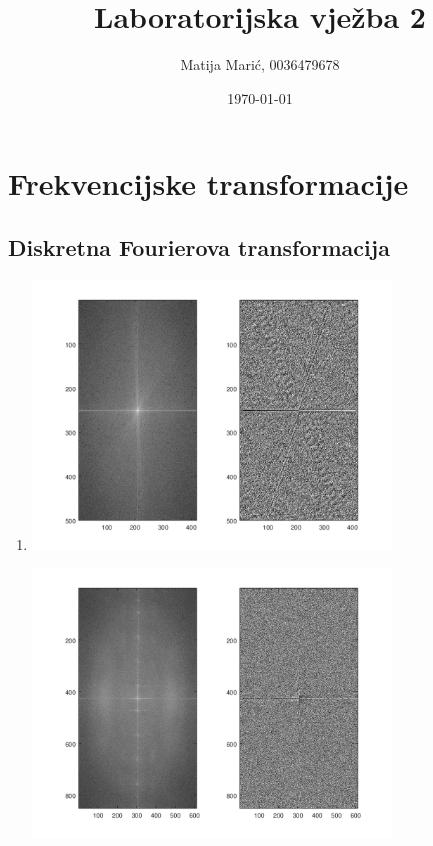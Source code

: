 \documentclass[12pt, a4]{report}
\title{Laboratorijska vježba 2}
\author{Matija Marić, 0036479678}
\date{\today}
\begin{document}
        \begin{titlepage}
            \maketitle
        \end{titlepage}

        \tableofcontents{}

        \chapter{Frekvencijske transformacije}
        \section{Diskretna Fourierova transformacija}
            \begin{enumerate}
                \item
                    \begin{minipage}{\linewidth}
                        \centering
                        \includegraphics[width=0.75\textwidth]{fft1}
                    \end{minipage}
                    \begin{minipage}{\linewidth}
                        \centering
                        \includegraphics[width=0.75\textwidth]{fft2}
                    \end{minipage}
            \end{enumerate}
        
\end{document}
